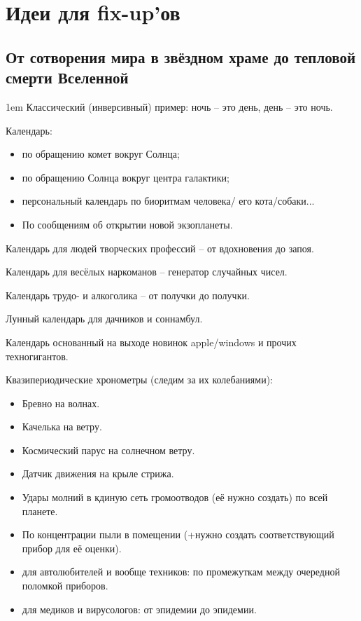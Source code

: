 \section{Идеи для fix-up'ов} %
\subsection{От сотворения мира в звёздном храме до тепловой смерти Вселенной}

\begin{flushleft}\parskip1em
    Классический (инверсивный) пример: ночь -- это день, день -- это ночь.

    Календарь:
    \begin{itemize}
        \item по обращению комет вокруг Солнца;
        \item по обращению Солнца вокруг центра галактики;
        \item персональный календарь по биоритмам человека/ его кота/собаки...
        \item По сообщениям об открытии новой экзопланеты.
    \end{itemize}

    Календарь для людей творческих профессий -- от вдохновения до запоя.

    Календарь для весёлых наркоманов -- генератор случайных чисел.

    Календарь трудо- и алкоголика -- от получки до получки.

    Лунный календарь для дачников и соннамбул.

    Календарь основанный на выходе новинок apple/windows и прочих техногигантов.

    Квазипериодические хронометры (следим за их колебаниями):
    \begin{itemize}
        \item Бревно на волнах.
        \item Качелька на ветру.
        \item Космический парус на солнечном ветру.
        \item Датчик движения на крыле стрижа.
        \item Удары молний в кдиную сеть громоотводов (её нужно создать) по всей планете.
        \item По концентрации пыли в помещении (+нужно создать соответствующий прибор для её оценки).
        \item для автолюбителей и вообще техников: по промежуткам между очередной поломкой приборов.
        \item для медиков и вирусологов: от эпидемии до эпидемии.
    \end{itemize}


\end{flushleft}

